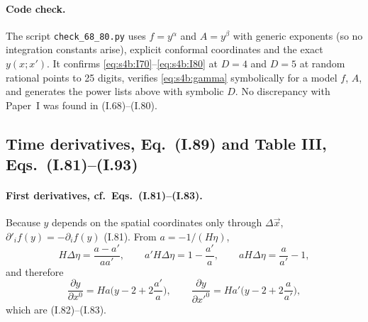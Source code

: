 \documentclass[aps,prd,onecolumn,10pt,nofootinbib,floatfix]{revtex4-2}
\newcommand{\PI}{Paper~I}
\newcommand{\eqI}[1]{(I.#1)}
\begin{document}
\paragraph*{Code check.}
The script \texttt{check\_68\_80.py} uses $f=y^\alpha$ and $A=y^\beta$ with generic exponents (so no integration constants
arise), explicit conformal coordinates and the exact $y(x;x')$. It confirms \eqref{eq:s4b:I70}--\eqref{eq:s4b:I80} at
$D=4$ and $D=5$ at random rational points to 25 digits, verifies \eqref{eq:s4b:gamma} symbolically for a model $f$,
$A$, and generates the power lists above with symbolic $D$. No discrepancy with \PI{} was found in
\eqI{68}--\eqI{80}.

\subsection{Time derivatives, Eq.~(I.89) and Table III, Eqs.~(I.81)--(I.93)}
\label{sec:s4b:tableIII}

\paragraph*{First derivatives, cf.\ Eqs.~(I.81)--(I.83).}
Because $y$ depends on the spatial coordinates only through $\Delta\vec x$, $\partial'_if(y)=-\partial_if(y)$ \eqI{81}.
From $a=-1/(H\eta)$,
\begin{equation}
H\Delta\eta=\frac{a-a'}{aa'},\qquad a'H\Delta\eta=1-\frac{a'}{a},\qquad aH\Delta\eta=\frac{a}{a'}-1,
\label{eq:s4b:aux}
\end{equation}
and therefore
\begin{equation}
\frac{\partial y}{\partial x^0}=Ha\Big(y-2+2\frac{a'}{a}\Big),\qquad
\frac{\partial y}{\partial x'^0}=Ha'\Big(y-2+2\frac{a}{a'}\Big),
\label{eq:s4b:I82}
\end{equation}
which are \eqI{82}--\eqI{83}.
\end{document}
